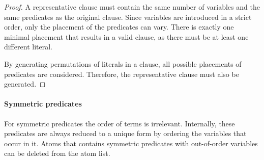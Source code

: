 \begin{proof}
	A representative clause must contain the same number of variables and the same predicates as the original clause.
	Since variables are introduced in a strict order, only the placement of the predicates can vary.
	There is exactly one minimal placement that results in a valid clause, as there must be at least one different literal.

	By generating permutations of literals in a clause, all possible placements of predicates are considered.
	Therefore, the representative clause must also be generated.
\end{proof}










\paragraph{Symmetric predicates}
For symmetric predicates the order of terms is irrelevant.
Internally, these predicates are always reduced to a unique form by ordering the variables that  occur in it.
Atoms that contains symmetric predicates with out-of-order variables can be deleted from the atom list.

